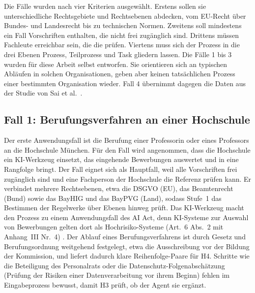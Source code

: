 Die Fälle wurden nach vier Kriterien ausgewählt.
Erstens sollen sie unterschiedliche Rechtsgebiete und Rechtsebenen abdecken, vom EU-Recht über Bundes- und Landesrecht bis zu technischen Normen.
Zweitens soll mindestens ein Fall Vorschriften enthalten, die nicht frei zugänglich sind.
Drittens müssen Fachleute erreichbar sein, die die  prüfen.
Viertens muss sich der Prozess in die drei Ebenen Prozess, Teilprozess und Task gliedern lassen.
Die Fälle 1 bis 3 wurden für diese Arbeit selbst entworfen.
Sie orientieren sich an typischen Abläufen in solchen Organisationen, geben aber keinen tatsächlichen Prozess einer bestimmten Organisation wieder.
Fall 4 übernimmt dagegen die Daten aus der Studie von Sai et al.~\cite{sai2024}.

\subsection{Fall 1: Berufungsverfahren an einer Hochschule}\label{sec:fall1}
Der erste Anwendungsfall ist die Berufung einer Professorin oder eines Professors an die Hochschule München.
Für den Fall wird angenommen, dass die Hochschule ein KI-Werkzeug einsetzt, das eingehende Bewerbungen auswertet und in eine Rangfolge bringt.
Der Fall eignet sich als Hauptfall, weil alle Vorschriften frei zugänglich sind und eine Fachperson der Hochschule die Referenz prüfen kann.
Er verbindet mehrere Rechtsebenen, etwa die DSGVO (EU), das Beamtenrecht (Bund) sowie das BayHIG und das BayPVG (Land), sodass Stufe~1 das Bestimmen der Regelwerke über Ebenen hinweg prüft.
Das KI-Werkzeug macht den Prozess zu einem Anwendungsfall des AI Act, denn KI-Systeme zur Auswahl von Bewerbungen gelten dort als Hochrisiko-Systeme (Art.~6 Abs.~2 mit Anhang~III Nr.~4) \cite{aiact2024}.
Der Ablauf eines Berufungsverfahrens ist durch Gesetz und Berufungsordnung weitgehend festgelegt, etwa die Ausschreibung vor der Bildung der Kommission, und liefert dadurch klare Reihenfolge-Paare für H4.
Schritte wie die Beteiligung des Personalrats oder die Datenschutz-Folgenabschätzung (Prüfung der Risiken einer Datenverarbeitung vor ihrem Beginn) fehlen im Eingabeprozess bewusst, damit H3 prüft, ob der Agent sie ergänzt.

